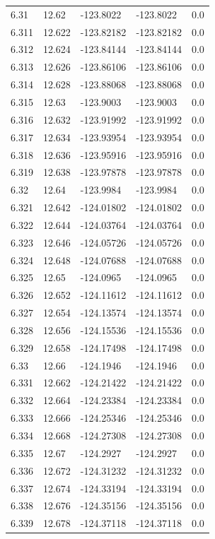 \begin{tabular}{lllll}
6.31 & 12.62 & -123.8022 & -123.8022 & 0.0 \\
6.311 & 12.622 & -123.82182 & -123.82182 & 0.0 \\
6.312 & 12.624 & -123.84144 & -123.84144 & 0.0 \\
6.313 & 12.626 & -123.86106 & -123.86106 & 0.0 \\
6.314 & 12.628 & -123.88068 & -123.88068 & 0.0 \\
6.315 & 12.63 & -123.9003 & -123.9003 & 0.0 \\
6.316 & 12.632 & -123.91992 & -123.91992 & 0.0 \\
6.317 & 12.634 & -123.93954 & -123.93954 & 0.0 \\
6.318 & 12.636 & -123.95916 & -123.95916 & 0.0 \\
6.319 & 12.638 & -123.97878 & -123.97878 & 0.0 \\
6.32 & 12.64 & -123.9984 & -123.9984 & 0.0 \\
6.321 & 12.642 & -124.01802 & -124.01802 & 0.0 \\
6.322 & 12.644 & -124.03764 & -124.03764 & 0.0 \\
6.323 & 12.646 & -124.05726 & -124.05726 & 0.0 \\
6.324 & 12.648 & -124.07688 & -124.07688 & 0.0 \\
6.325 & 12.65 & -124.0965 & -124.0965 & 0.0 \\
6.326 & 12.652 & -124.11612 & -124.11612 & 0.0 \\
6.327 & 12.654 & -124.13574 & -124.13574 & 0.0 \\
6.328 & 12.656 & -124.15536 & -124.15536 & 0.0 \\
6.329 & 12.658 & -124.17498 & -124.17498 & 0.0 \\
6.33 & 12.66 & -124.1946 & -124.1946 & 0.0 \\
6.331 & 12.662 & -124.21422 & -124.21422 & 0.0 \\
6.332 & 12.664 & -124.23384 & -124.23384 & 0.0 \\
6.333 & 12.666 & -124.25346 & -124.25346 & 0.0 \\
6.334 & 12.668 & -124.27308 & -124.27308 & 0.0 \\
6.335 & 12.67 & -124.2927 & -124.2927 & 0.0 \\
6.336 & 12.672 & -124.31232 & -124.31232 & 0.0 \\
6.337 & 12.674 & -124.33194 & -124.33194 & 0.0 \\
6.338 & 12.676 & -124.35156 & -124.35156 & 0.0 \\
6.339 & 12.678 & -124.37118 & -124.37118 & 0.0 \\

\end{tabular}
